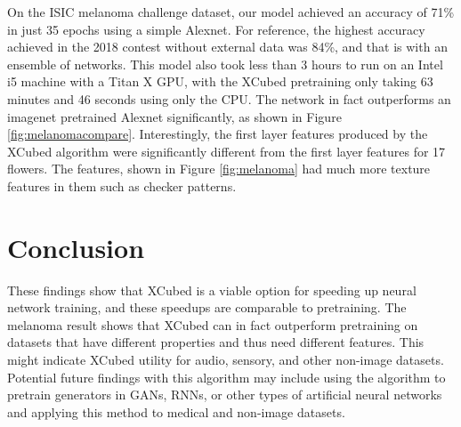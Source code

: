 \documentclass[twocolumn]{article}
\begin{document}
On the ISIC melanoma challenge dataset\cite{melanoma1}\cite{melanoma2}, our model achieved an accuracy of 71\% in just 35 epochs using a simple Alexnet. For reference, the highest accuracy achieved in the 2018 contest without external data was 84\%, and that is with an ensemble of networks. This model also took less than 3 hours to run on an Intel i5 machine with a Titan X GPU, with the XCubed pretraining only taking 63 minutes and 46 seconds using only the CPU. The network in fact outperforms an imagenet pretrained Alexnet significantly, as shown in Figure \ref{fig:melanomacompare}. Interestingly, the first layer features produced by the XCubed algorithm were significantly different from the first layer features for 17 flowers. The features, shown in Figure \ref{fig:melanoma} had much more texture features in them such as checker patterns.
\section{Conclusion}
These findings show that XCubed is a viable option for speeding up neural network training, and these speedups are comparable to pretraining. The melanoma result shows that XCubed can in fact outperform pretraining on datasets that have different properties and thus need different features. This might indicate XCubed utility for audio, sensory, and other non-image datasets. Potential future findings with this algorithm may include using the algorithm to pretrain generators in GANs, RNNs, or other types of artificial neural networks and applying this method to medical and non-image datasets.
\end{document}
